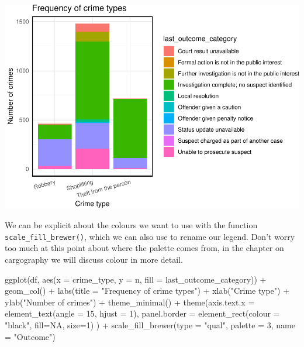 \documentclass[
]{book}
\makeatletter
\newenvironment{Shaded}{\begin{snugshade}}{\end{snugshade}}
\newcommand{\AttributeTok}[1]{\textcolor[rgb]{0.61,0.61,0.61}{#1}}
\newcommand{\ConstantTok}[1]{\textcolor[rgb]{0,0,0}{#1}}
\newcommand{\DecValTok}[1]{\textcolor[rgb]{0.06,0.06,0.06}{#1}}
\newcommand{\FunctionTok}[1]{\textcolor[rgb]{0,0,0}{#1}}
\newcommand{\NormalTok}[1]{#1}
\newcommand{\SpecialCharTok}[1]{\textcolor[rgb]{0,0,0}{#1}}
\newcommand{\StringTok}[1]{\textcolor[rgb]{0.5,0.5,0.5}{#1}}
\newenvironment{kframe}{%
\medskip{}
\setlength{\fboxsep}{.8em}
 \def\at@end@of@kframe{}%
 \ifinner\ifhmode%
  \def\at@end@of@kframe{\end{minipage}}%
  \begin{minipage}{\columnwidth}%
 \fi\fi%
 \def\FrameCommand##1{\hskip\@totalleftmargin \hskip-\fboxsep
 \colorbox{shadecolor}{##1}\hskip-\fboxsep
     \hskip-\linewidth \hskip-\@totalleftmargin \hskip\columnwidth}%
 \MakeFramed {\advance\hsize-\width
   \@totalleftmargin\z@ \linewidth\hsize
   \@setminipage}}%
 {\par\unskip\endMakeFramed%
 \at@end@of@kframe}
\renewenvironment{Shaded}{\begin{kframe}}{\end{kframe}}
\makeatother
\begin{document}
\includegraphics{crime_mapping_files/figure-latex/unnamed-chunk-12-1.pdf}

We can be explicit about the colours we want to use with the function \texttt{scale\_fill\_brewer()}, which we can also use to rename our legend. Don't worry too much at this point about where the palette comes from, in the chapter on cargography we will discuss colour in more detail.

\begin{Shaded}
\begin{Highlighting}[]
\FunctionTok{ggplot}\NormalTok{(df, }\FunctionTok{aes}\NormalTok{(}\AttributeTok{x =}\NormalTok{ crime\_type, }
               \AttributeTok{y =}\NormalTok{ n, }
               \AttributeTok{fill =}\NormalTok{ last\_outcome\_category)) }\SpecialCharTok{+} 
  \FunctionTok{geom\_col}\NormalTok{() }\SpecialCharTok{+} 
  \FunctionTok{labs}\NormalTok{(}\AttributeTok{title =} \StringTok{"Frequency of crime types"}\NormalTok{) }\SpecialCharTok{+} 
  \FunctionTok{xlab}\NormalTok{(}\StringTok{"Crime type"}\NormalTok{) }\SpecialCharTok{+} 
  \FunctionTok{ylab}\NormalTok{(}\StringTok{"Number of crimes"}\NormalTok{) }\SpecialCharTok{+} 
  \FunctionTok{theme\_minimal}\NormalTok{() }\SpecialCharTok{+} 
  \FunctionTok{theme}\NormalTok{(}\AttributeTok{axis.text.x =} \FunctionTok{element\_text}\NormalTok{(}\AttributeTok{angle =} \DecValTok{15}\NormalTok{, }
                                   \AttributeTok{hjust =} \DecValTok{1}\NormalTok{), }
        \AttributeTok{panel.border =} \FunctionTok{element\_rect}\NormalTok{(}\AttributeTok{colour =} \StringTok{"black"}\NormalTok{, }
                                    \AttributeTok{fill=}\ConstantTok{NA}\NormalTok{, }
                                    \AttributeTok{size=}\DecValTok{1}\NormalTok{)}
\NormalTok{        ) }\SpecialCharTok{+} 
  \FunctionTok{scale\_fill\_brewer}\NormalTok{(}\AttributeTok{type =} \StringTok{"qual"}\NormalTok{, }\AttributeTok{palette =} \DecValTok{3}\NormalTok{, }\AttributeTok{name =} \StringTok{"Outcome"}\NormalTok{)}
\end{Highlighting}
\end{Shaded}
\end{document}
